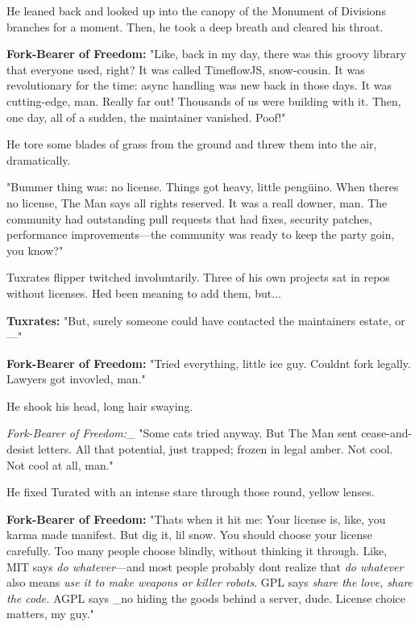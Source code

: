 He leaned back and looked up into the canopy of the Monument of Division\textquotesingle s branches for a moment. Then, he took a deep breath and cleared his throat.

\textbf{Fork-Bearer of Freedom:} "Like, back in my day, there was this groovy library that everyone used, right? It was called TimeflowJS, snow-cousin. It was revolutionary for the time: async handling was new back in those days. It was cutting-edge, man. Really far out! Thousands of us were building with it. Then, one day, all of a sudden, the maintainer vanished. Poof!"

He tore some blades of grass from the ground and threw them into the air, dramatically.

"Bummer thing was: no license. Things got heavy, little pengüino. When there\textquotesingle s no license, \textquotesingle The Man\textquotesingle{} says \textquotesingle all rights reserved.\textquotesingle{} It was a reall downer, man. The community had outstanding pull requests that had fixes, security patches, performance improvements---the community was ready to keep the party goin\textquotesingle, you know?"

Tuxrates\textquotesingle{} flipper twitched involuntarily. Three of his own projects sat in repos without licenses. He\textquotesingle d been meaning to add them, but...

\textbf{Tuxrates:} "But, surely someone could have contacted the maintainer\textquotesingle s estate, or---"

\textbf{Fork-Bearer of Freedom:} "Tried everything, little ice guy. Couldn\textquotesingle t fork legally. Lawyers got invovled, man."

He shook his head, long hair swaying.

\emph{Fork-Bearer of Freedom:}\_ "Some cats tried anyway. But \textquotesingle The Man\textquotesingle{} sent cease-and-desist letters. All that potential, just trapped; frozen in legal amber. Not cool. Not cool at all, man."

He fixed Turated with an intense stare through those round, yellow lenses.

\textbf{Fork-Bearer of Freedom:} "That\textquotesingle s when it hit me: Your license is, like, you karma made manifest. But dig it, lil\textquotesingle{} snow. You should choose your license carefully. Too many people choose blindly, without thinking it through. Like, MIT says \emph{\textquotesingle do whatever\textquotesingle{}}---and most people probably don\textquotesingle t realize that \emph{\textquotesingle do whatever\textquotesingle{}} also means \emph{\textquotesingle use it to make weapons or killer robots\textquotesingle{}}. GPL says \emph{\textquotesingle share the love, share the code.\textquotesingle{}} AGPL says \_\textquotesingle no hiding the goods behind a server, dude.\textquotesingle{} License choice matters, my guy."


